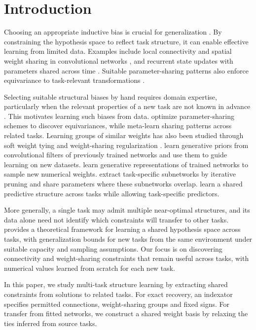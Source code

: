 \section{Introduction}

Choosing an appropriate inductive bias is crucial for generalization \cite{baxter2000model}.
By constraining the hypothesis space to reflect task structure, it can enable effective learning from limited data.
Examples include local connectivity and spatial weight sharing in convolutional networks \cite{lecun1998gradient}, and recurrent state updates with parameters shared across time \cite{elman1990finding}.
Suitable parameter-sharing patterns also enforce equivariance to task-relevant transformations \cite{ravanbakhsh2017equivariance}.

Selecting suitable structural biases by hand requires domain expertise, particularly when the relevant properties of a new task are not known in advance \cite{yeh2022equivariance}.
This motivates learning such biases from data.
\citet{yeh2022equivariance} optimize parameter-sharing schemes to discover equivariances, while \citet{zhou2021meta} meta-learn sharing patterns across related tasks.
Learning groups of similar weights has also been studied through soft weight tying \cite{nowlan1991adaptive} and weight-sharing regularization \cite{shakerinava2024weight}.
\citet{atanov2019deep} learn generative priors from convolutional filters of previously trained networks and use them to guide learning on new datasets.
\citet{schurholt2022hyper} learn generative representations of trained networks to sample new numerical weights.
\citet{sun2020sparse} extract task-specific subnetworks by iterative pruning and share parameters where these subnetworks overlap.
\citet{ando2005framework} learn a shared predictive structure across tasks while allowing task-specific predictors.

More generally, a single task may admit multiple near-optimal structures, and its data alone need not identify which constraints will transfer to other tasks.
\citet{baxter2000model} provides a theoretical framework for learning a shared hypothesis space across tasks, with generalization bounds for new tasks from the same environment under suitable capacity and sampling assumptions.
Our focus is on discovering connectivity and weight-sharing constraints that remain useful across tasks, with numerical values learned from scratch for each new task.

In this paper, we study multi-task structure learning by extracting
shared constraints from solutions to related tasks. For exact recovery,
an indexator specifies permitted connections, weight-sharing groups and
fixed signs. For transfer from fitted networks, we construct a shared
weight basis by relaxing the ties inferred from source tasks.

